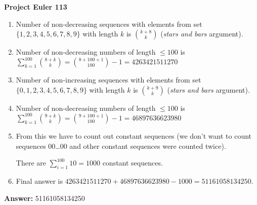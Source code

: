 \documentclass[a4paper,12pt]{article}
\begin{document}
\setlength\parindent{0pt}
\textbf{Project Euler 113}
\vspace{5ex}


\begin{enumerate}
\item Number of non-decreasing sequences with elements from set
\(\{1, 2, 3, 4, 5, 6, 7, 8, 9\}\) with length \(k\) is \(\binom{k + 8}{k}\)
(\textit{stars and bars} argument).
\item Number of non-decreasing numbers of length \(\leq 100\) is
\(\sum_{k = 1}^{100} \binom{8 + k}{k} = \binom{8 + 100 + 1}{100} - 1
= 4263421511270\)
\item Number of non-increasing sequences with elements from set
\(\{0, 1, 2, 3, 4, 5, 6, 7, 8, 9\}\) with length \(k\) is \(\binom{k + 9}{k}\)
(\textit{stars and bars} argument).
\item Number of non-decreasing numbers of length \(\leq 100\) is
\(\sum_{k = 1}^{100} \binom{9 + k}{k} = \binom{9 + 100 + 1}{100} - 1
= 46897636623980\)
\item From this we have to count out constant sequences
(we don't want to count sequences 00\dots00 and other constant sequences
were counted twice).

There are \(\sum_{i = 1}^{100} 10 = 1000\) constant sequences.
\item Final answer is \(4263421511270 + 46897636623980 - 1000 = 51161058134250\).
\end{enumerate}

\vspace{5ex}
\textbf{Answer:}
51161058134250
\end{document}
